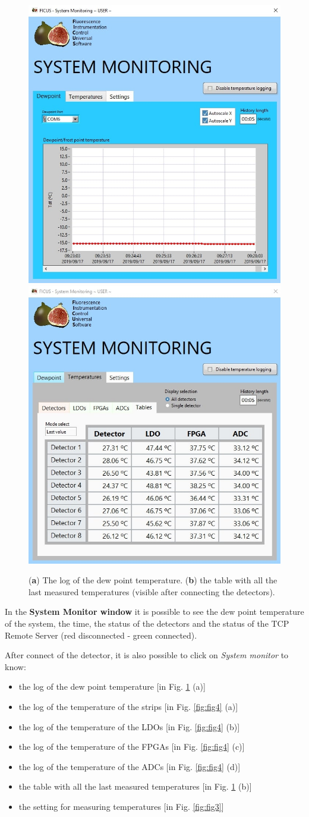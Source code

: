 \documentclass[a4paper,12pt,oneside,pdflatex,italian,final,twocolumn]{article}
\begin{document}
\begin{figure}[h]
\centering
\subfloat
{\includegraphics[width=.45\textwidth]{Capture15.jpg}} \quad
\subfloat
{\includegraphics[width=.45\textwidth]{Capture19.jpg}} \\

\caption{(\textbf{a}) The log of the dew point temperature. (\textbf{b}) the table with all the last measured temperatures (visible after connecting the detectors).}\label{fig:fig2}
\end{figure}

In the \textbf{System Monitor window} it is possible to see the dew point temperature of the system, the time, the status of the detectors and the status of the TCP Remote Server (red disconnected - green connected). 

After connect of the detector, it is also possible to click on \textit{System monitor} to know: 
\begin{itemize}
    \item the log of the dew point temperature [in Fig. \ref{fig:fig2} (a)]
    \item the log of the temperature of the strips [in Fig. \ref{fig:fig4} (a)]
    \item the log of the temperature of the LDOs [in Fig. \ref{fig:fig4} (b)]
    \item the log of the temperature of the FPGAs [in Fig. \ref{fig:fig4} (c)]
    \item the log of the temperature of the ADCs [in Fig. \ref{fig:fig4} (d)]
    \item the table with all the last measured temperatures [in Fig. \ref{fig:fig2} (b)]
    \item the setting for measuring temperatures [in Fig. \ref{fig:fig3}]
\end{itemize}
\end{document}
